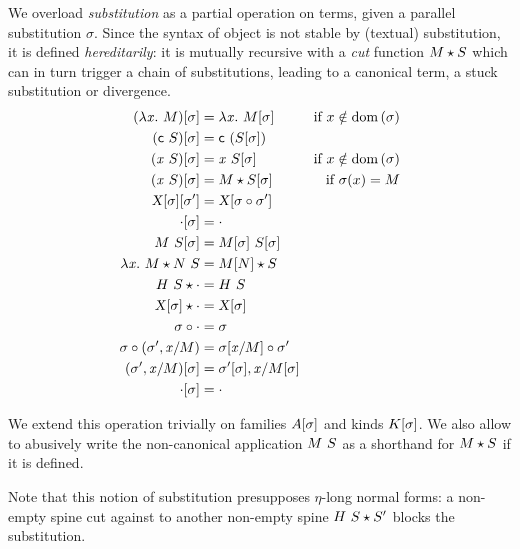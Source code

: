\documentclass[9pt]{sigplanconf}
\begin{document}
We overload \emph{substitution} as a partial operation on terms, given
a parallel substitution $\sigma$. Since the syntax of object is not
stable by (textual) substitution, it is defined \emph{hereditarily}: it
is mutually recursive with a \emph{cut} function ${M}\star{S}$ which can
in turn trigger a chain of substitutions, leading to a canonical term,
a stuck substitution or divergence. %
\begin{align*}
  {(\lambda{\ensuremath{\text{\textit{x}}}}.\ M)}[{\sigma}] &= \lambda{\ensuremath{\text{\textit{x}}}}.\  {{M}[{\sigma}]} &
  \text{if $x\notin \operatorname{dom}{(\sigma)}$}
  \\
  {({\text{\textsf{c}}}\  S)}[{\sigma}] &= {\text{\textsf{c}}}\  {({S}[{\sigma}])}
  \\
  {({\text{\textit{x}}}\  S)}[{\sigma}] &=
  {\text{\textit{x}}}\  {{S}[{\sigma}]} &
  \text{if $x\notin \operatorname{dom}{(\sigma)}$}
  \\
  {({\text{\textit{x}}}\  S)}[{\sigma}] &=
  {M}\star{{S}[{\sigma}]} &
  \text{if $\sigma(x) = M$}
  \\
  {{\text{\textsl{X}}}[{\sigma}]}[{\sigma'}] &=
  {\text{\textsl{X}}}[{{\sigma}\circ{\sigma'}}]
  \\
  {\cdot}[{\sigma}] &=
  \cdot \\
  {{M}\ {S}}[{\sigma}] &=
  {{M}[{\sigma}]}\ {{S}[{\sigma}]}
  \\
  {\lambda{\ensuremath{\text{\textit{x}}}}.\  M}\star{{N}\ {S}} &=
  {{M}[{N}]}\star{S}
  \\
  {{H}\  S}\star{\cdot} &=
  {H}\  S
  \\
  {{\text{\textsl{X}}}[{\sigma}]}\star{\cdot} &= {\text{\textsl{X}}}[{\sigma}]
  \\
  {\sigma}\circ{\cdot} &=
  \sigma
  \\
  {\sigma}\circ{({\sigma'},{{\ensuremath{\text{\textit{x}}}}/{M}})} &=
  {{\sigma}[{{\text{\textit{x}}}/{M}}]}\circ{\sigma}'
  \\
  {({\sigma'},{{\text{\textit{x}}}/{M}})}[{\sigma}] &=
  {{\sigma'}[{\sigma}]},{{\text{\textit{x}}}/{{M}[{\sigma}]}}
  \\
  {\cdot}[{\sigma}] &= \cdot
\end{align*}

We extend this operation trivially on families ${A}[{\sigma}]$ and
kinds ${K}[{\sigma}]$. We also allow to abusively write the
non-canonical application ${M}\  S$ as a shorthand for ${M}\star{S}$ if
it is defined.

Note that this notion of substitution presupposes $\eta$-long normal
forms: a non-empty spine cut against to another non-empty spine ${{H}\  S}\star{S'}$ blocks the substitution.
\end{document}
